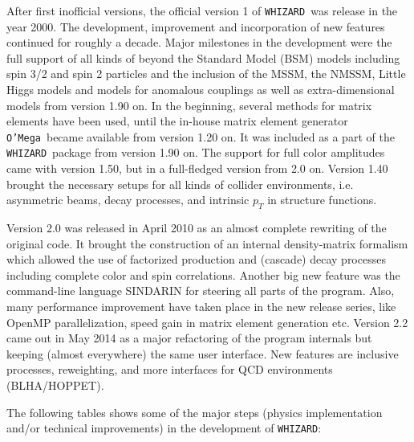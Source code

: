 \documentclass[12pt]{book}
\newcommand{\whizard}{\texttt{WHIZARD}}
\newcommand{\oMega}{\texttt{O'Mega}}
\begin{document}
After first inofficial versions, the official version 1 of \whizard\
was release in the year 2000. The development, improvement and
incorporation of new features continued for roughly a decade. Major
milestones in the development were the full support of all kinds of
beyond the Standard Model (BSM) models including spin 3/2 and spin 2
particles and the inclusion of the MSSM, the NMSSM, Little Higgs
models and models for anomalous couplings as well as extra-dimensional
models from version 1.90 on. In the beginning, several methods for
matrix elements have been used, until the in-house matrix element
generator \oMega\ became available from version 1.20 on. It was
included as a part of the \whizard\ package from version 1.90 on. The
support for full color amplitudes came with version 1.50, but in a
full-fledged version from 2.0 on. Version 1.40 brought the necessary
setups for all kinds of collider environments, i.e. asymmetric beams,
decay processes, and intrinsic $p_T$ in structure functions. 

Version 2.0 was released in April 2010 as an almost complete rewriting
of the original code. It brought the construction of an internal
density-matrix formalism which allowed the use of factorized
production and (cascade) decay processes including complete color and
spin correlations. Another big new feature was the command-line
language SINDARIN for steering all parts of the program. Also, many
performance improvement have taken place in the new release series,
like OpenMP parallelization, speed gain in matrix element generation
etc. Version 2.2 came out in May 2014 as a major refactoring of the
program internals but keeping (almost everywhere) the same user
interface. New features are inclusive processes, reweighting, and more
interfaces for QCD environments (BLHA/HOPPET).

The following tables shows some of the major steps (physics
implementation and/or technical improvements) in the development
of \whizard:
\end{document}
